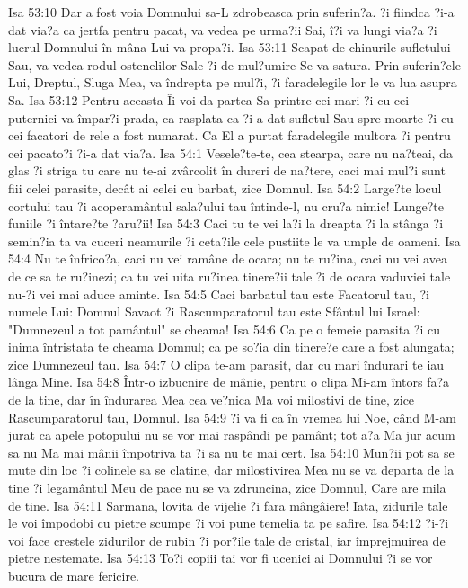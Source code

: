 Isa 53:10  Dar a fost voia Domnului sa-L zdrobeasca prin suferin?a. ?i fiindca ?i-a dat via?a ca jertfa pentru pacat, va vedea pe urma?ii Sai, î?i va lungi via?a ?i lucrul Domnului în mâna Lui va propa?i.
Isa 53:11  Scapat de chinurile sufletului Sau, va vedea rodul ostenelilor Sale ?i de mul?umire Se va satura. Prin suferin?ele Lui, Dreptul, Sluga Mea, va îndrepta pe mul?i, ?i faradelegile lor le va lua asupra Sa.
Isa 53:12  Pentru aceasta Îi voi da partea Sa printre cei mari ?i cu cei puternici va împar?i prada, ca rasplata ca ?i-a dat sufletul Sau spre moarte ?i cu cei facatori de rele a fost numarat. Ca El a purtat faradelegile multora ?i pentru cei pacato?i ?i-a dat via?a.
Isa 54:1  Vesele?te-te, cea stearpa, care nu na?teai, da glas ?i striga tu care nu te-ai zvârcolit în dureri de na?tere, caci mai mul?i sunt fiii celei parasite, decât ai celei cu barbat, zice Domnul.
Isa 54:2  Large?te locul cortului tau ?i acoperamântul sala?ului tau întinde-l, nu cru?a nimic! Lunge?te funiile ?i întare?te ?aru?ii!
Isa 54:3  Caci tu te vei la?i la dreapta ?i la stânga ?i semin?ia ta va cuceri neamurile ?i ceta?ile cele pustiite le va umple de oameni.
Isa 54:4  Nu te înfrico?a, caci nu vei ramâne de ocara; nu te ru?ina, caci nu vei avea de ce sa te ru?inezi; ca tu vei uita ru?inea tinere?ii tale ?i de ocara vaduviei tale nu-?i vei mai aduce aminte.
Isa 54:5  Caci barbatul tau este Facatorul tau, ?i numele Lui: Domnul Savaot ?i Rascumparatorul tau este Sfântul lui Israel: "Dumnezeul a tot pamântul" se cheama!
Isa 54:6  Ca pe o femeie parasita ?i cu inima întristata te cheama Domnul; ca pe so?ia din tinere?e care a fost alungata; zice Dumnezeul tau.
Isa 54:7  O clipa te-am parasit, dar cu mari îndurari te iau lânga Mine.
Isa 54:8  Într-o izbucnire de mânie, pentru o clipa Mi-am întors fa?a de la tine, dar în îndurarea Mea cea ve?nica Ma voi milostivi de tine, zice Rascumparatorul tau, Domnul.
Isa 54:9  ?i va fi ca în vremea lui Noe, când M-am jurat ca apele potopului nu se vor mai raspândi pe pamânt; tot a?a Ma jur acum sa nu Ma mai mânii împotriva ta ?i sa nu te mai cert.
Isa 54:10  Mun?ii pot sa se mute din loc ?i colinele sa se clatine, dar milostivirea Mea nu se va departa de la tine ?i legamântul Meu de pace nu se va zdruncina, zice Domnul, Care are mila de tine.
Isa 54:11  Sarmana, lovita de vijelie ?i fara mângâiere! Iata, zidurile tale le voi împodobi cu pietre scumpe ?i voi pune temelia ta pe safire.
Isa 54:12  ?i-?i voi face crestele zidurilor de rubin ?i por?ile tale de cristal, iar împrejmuirea de pietre nestemate.
Isa 54:13  To?i copiii tai vor fi ucenici ai Domnului ?i se vor bucura de mare fericire.
